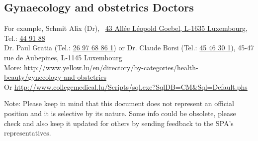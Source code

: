 \subsection{Gynaecology and obstetrics Doctors}
For example, Schmit Alix (Dr), \
\href{http://goo.gl/i4Dw3k}{43 All\'ee L\'eopold Goebel, L-1635 Luxembourg}, Tel.: \href{callto:44 91 88}{44 91 88} \\
Dr. Paul Gratia (Tel.: \href{callto:26 97 68 86 1}{26 97 68 86 1}) or Dr. Claude Borsi (Tel.: \href{callto:45 46 30 1}{45 46 30 1}), 45-47 rue de Aubepines, L-1145 Luxembourg\\
More: \url{http://www.yellow.lu/en/directory/by-categories/health-beauty/gynecology-and-obstetrics}\\
Or \url{http://www.collegemedical.lu/Scripts/sql.exe?SqlDB=CM&Sql=Default.phs}
 
Note:
Please keep in mind that this document does not represent an official position and it is selective by its nature.
Some info could be obsolete, please check and also keep it updated for others by sending feedback to the SPA's representatives. 